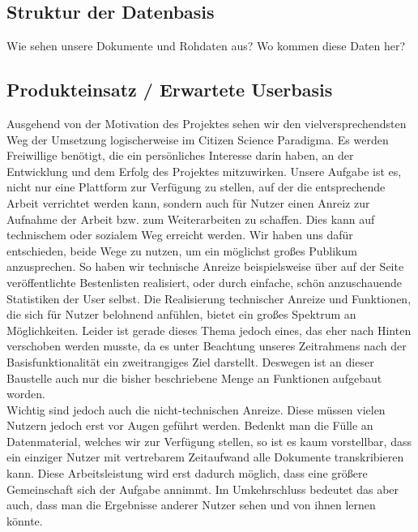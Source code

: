 \documentclass{article}
\begin{document}

\subsection{Struktur der Datenbasis}
Wie sehen unsere Dokumente und Rohdaten aus?
Wo kommen diese Daten her?

\subsection{Produkteinsatz / Erwartete Userbasis}
Ausgehend von der Motivation des Projektes sehen wir den vielversprechendsten Weg der Umsetzung logischerweise im Citizen Science Paradigma. Es werden Freiwillige benötigt, die ein persönliches Interesse darin haben, an der Entwicklung und dem Erfolg des Projektes mitzuwirken. Unsere Aufgabe ist es, nicht nur eine Plattform zur Verfügung zu stellen, auf der die entsprechende Arbeit verrichtet werden kann, sondern auch für Nutzer einen Anreiz zur Aufnahme der Arbeit bzw. zum Weiterarbeiten zu schaffen. Dies kann auf technischem oder sozialem Weg erreicht werden. 
Wir haben uns dafür entschieden, beide Wege zu nutzen, um ein möglichst großes Publikum anzusprechen. So haben wir technische Anreize beispielsweise über auf der Seite veröffentlichte Bestenlisten realisiert, oder durch einfache, schön anzuschauende Statistiken der User selbst. Die Realisierung technischer Anreize und Funktionen, die sich für Nutzer belohnend anfühlen, bietet ein großes Spektrum an Möglichkeiten. Leider ist gerade dieses Thema jedoch eines, das eher nach Hinten verschoben werden musste, da es unter Beachtung unseres Zeitrahmens nach der Basisfunktionalität ein zweitrangiges Ziel darstellt. Deswegen ist an dieser Baustelle auch nur die bisher beschriebene Menge an Funktionen aufgebaut worden. \\
Wichtig sind jedoch auch die nicht-technischen Anreize. Diese müssen vielen Nutzern jedoch erst vor Augen geführt werden. Bedenkt man die Fülle an Datenmaterial, welches wir zur Verfügung stellen, so ist es kaum vorstellbar, dass ein einziger Nutzer mit vertrebarem Zeitaufwand alle Dokumente transkribieren kann. Diese Arbeitsleistung wird erst dadurch möglich, dass eine größere Gemeinschaft sich der Aufgabe annimmt. Im Umkehrschluss bedeutet das aber auch, dass man die Ergebnisse anderer Nutzer sehen und von ihnen lernen könnte. 
\end{document}
